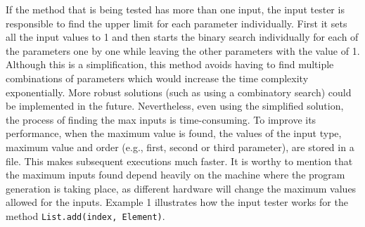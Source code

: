 If the method that is being tested has more than one input, the input tester is responsible to find the upper limit for each parameter individually. First it sets all the input values to 1 and then starts the binary search individually for each of the parameters one by one while leaving the other parameters with the value of 1. Although this is a simplification, this method avoids having to find multiple combinations of parameters which would increase the time complexity exponentially. More robust solutions (such as using a combinatory search) could be implemented in the future. Nevertheless, even using the simplified solution, the process of finding the max inputs is time-consuming. To improve its performance, when the maximum value is found, the values of the input type, maximum value and order (e.g., first, second or third parameter), are stored in a file. This makes subsequent executions much faster. It is worthy to mention that the maximum inputs found depend heavily on the machine where the program generation is taking place, as different hardware will change the maximum values allowed for the inputs. Example 1 illustrates how the input tester works for the method \texttt{List.add(index, Element)}.

